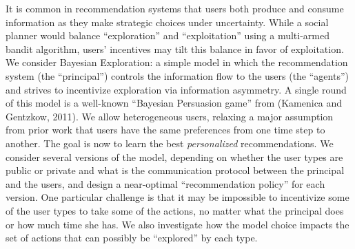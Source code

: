 It is common in recommendation systems that users both produce and consume information as they make strategic choices under uncertainty. While a social planner would balance “exploration” and “exploitation” using a multi-armed bandit algorithm, users’ incentives may tilt this balance in favor of exploitation. We consider Bayesian Exploration: a simple model in which the recommendation system (the “principal”) controls the information flow to the users (the “agents”) and strives to incentivize exploration via information asymmetry. A single round of this model is a well-known “Bayesian Persuasion game” from (Kamenica and Gentzkow, 2011). We allow heterogeneous users, relaxing a major assumption from prior work that users have the same preferences from one time step to another. The goal is now to learn the best \emph{personalized} recommendations. We consider several versions of the model, depending on whether the user types are public or private and what is the communication protocol between the principal and the users, and design a near-optimal “recommendation policy” for each version. One particular challenge is that it may be impossible to incentivize some of the user types to take some of the actions, no matter what the principal does or how much time she has. We also investigate how the model choice impacts the set of actions that can possibly be “explored” by each type.
